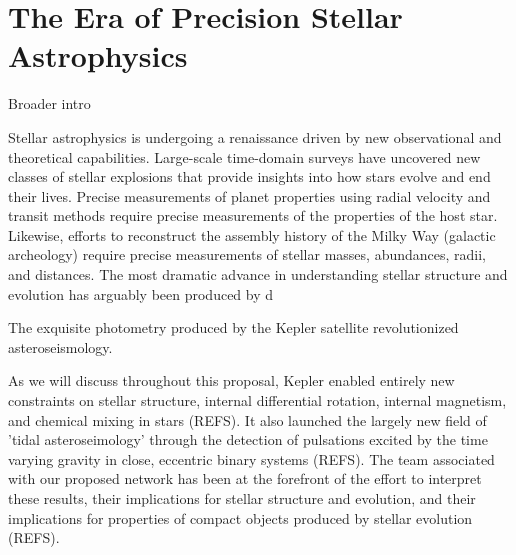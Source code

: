 \section{The Era of Precision Stellar Astrophysics}
Broader intro

Stellar astrophysics is undergoing a renaissance driven by new observational and theoretical capabilities. Large-scale time-domain surveys have uncovered new classes of stellar explosions that provide insights into how stars evolve and end their lives.  Precise measurements of planet properties using radial velocity and transit methods require precise measurements of the properties of the host star.  Likewise, efforts to reconstruct the assembly history of the Milky Way (galactic archeology) require precise measurements of stellar masses, abundances, radii, and distances.    The most dramatic advance in understanding stellar structure and evolution has arguably been produced by d

The exquisite photometry produced by the Kepler satellite revolutionized asteroseismology.  

As we will discuss throughout this proposal, Kepler enabled entirely new constraints on stellar structure, internal differential rotation, internal magnetism, and chemical mixing in stars (REFS).  It also launched the largely new field of 'tidal asteroseimology' through the detection of pulsations excited by the time varying gravity in close, eccentric binary systems (REFS). The team associated with our proposed network has been at the forefront of the effort to interpret these results, their implications for stellar structure and evolution, and their implications for properties of compact objects produced by stellar evolution (REFS).   


